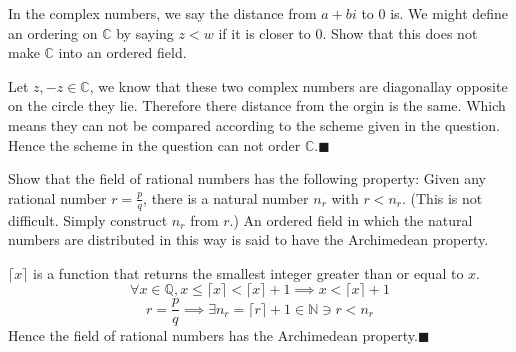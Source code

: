 \documentclass[addpoints]{exam}
\theoremstyle{mytheoremstyle}
\theoremstyle{mytheoremstyle}
\theoremstyle{myproblemstyle}
\begin{document}
\begin{questions}


	\question[1] In the complex numbers, we say the distance from \(a + bi\) to 0 is. We might define an ordering on \(\mathbb{C}\) by saying \(z < w\) if it is closer to 0. Show that this does not make \(\mathbb{C}\) into an ordered field.
	\begin{solution}
		Let \(z,-z\in\mathbb{C}\), we know that these two complex numbers are diagonallay opposite on the circle they lie. Therefore there distance from the orgin is the same. Which means they can not be compared according to the scheme given in the question. Hence the scheme in the question can not order \(\mathbb{C}\).\hfill\(\blacksquare\)
	\end{solution}

	\question[1] Show that the field of rational numbers has the following property: Given any rational number \(r = \frac{p}{q}\), there is a natural number \(n_r\) with \(r < n_r\). (This is not difficult. Simply construct \(n_r\) from \(r\).) An ordered field in which the natural numbers are distributed in this way is said to have the Archimedean property.
	\begin{solution}
		\(\lceil x\rceil\) is a function that returns the smallest integer greater than or equal to \(x\).
		\[\forall x\in\mathbb{Q}, x\le\lceil x\rceil < \lceil x\rceil+1\implies x< \lceil x\rceil+1\]
		\[r = \frac{p}{q}\implies \exists n_r=\lceil r\rceil + 1\in\mathbb{N}\ni r<n_r\]
		Hence the field of rational numbers has the Archimedean property.\hfill\(\blacksquare\)
	\end{solution}


\end{questions}
\end{document}
